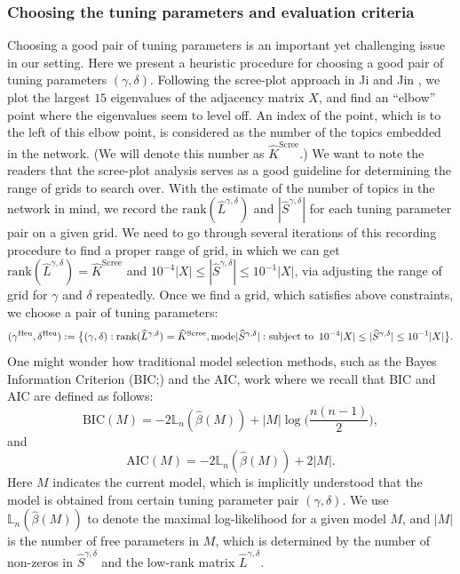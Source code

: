 \documentclass[AMS,STIX1COL]{WileyNJD-v2}
\newcommand{\Hquad}{\hspace{0.5em}}
\begin{document}
{\subsubsection{Choosing the tuning parameters and evaluation criteria} \label{sec:Eval-crit}
Choosing a good pair of tuning parameters is an important yet challenging issue in our setting.
Here we present a heuristic procedure for choosing a good pair of tuning parameters $(\gamma,\delta)$.
Following the scree-plot approach in Ji and Jin \cite{ji2016coauthorship}, we plot the largest $15$ eigenvalues of the adjacency matrix $X$, and find an ``elbow'' point where the eigenvalues seem to level off.
An index of the point, which is to the left of this elbow point, is considered as the number of the topics embedded in the network.
(We will denote this number as $\widehat{K}^{\text{Scree}}$.)
We want to note the readers that the scree-plot analysis serves as a good guideline for determining the range of grids to search over.
With the estimate of the number of topics in the network in mind, we record the $\text{rank}(\widehat{L}^{\gamma,\delta})$ and $|\widehat{S}^{\gamma,\delta}|$ for each tuning parameter pair on a given grid.
We need to go through several iterations of this recording procedure to find a proper range of grid, in which we can get $\text{rank}(\widehat{L}^{\gamma,\delta})=\widehat{K}^{\text{Scree}}$
and $10^{-4}|X| \leq |\widehat{S}^{\gamma,\delta}| \leq 10^{-1}|X|$, via adjusting the range of grid for $\gamma$ and $\delta$ repeatedly.
Once we find a grid, which satisfies above constraints, we choose a pair of tuning parameters: %
\[
    (\gamma^{\text{Heu}},\delta^{\text{Heu}}):=
    \big\{(\gamma,\delta): \text{rank}(\widehat{L}^{\gamma,\delta})=\widehat{K}^{\text{Scree}},
    \mbox{mode} |\widehat{S}^{\gamma,\delta}|: \mbox{subject to} \Hquad 10^{-4}|X| \leq |\widehat{S}^{\gamma,\delta}| \leq 10^{-1}|X| \big\}.
\]
One might wonder how traditional model selection methods, such as the Bayes Information Criterion (BIC;\cite{schwarz1978estimating}) and the AIC, work where we recall that BIC and AIC are defined as follows:
\[
\mbox{BIC}(M) = -2  \mathbb{L}_n( \hat{\beta}(M)) + |M| \log \bigg(\frac{n(n-1)}{2}\bigg),
\]
and
\[
\mbox{AIC}(M) = -2  \mathbb{L}_n( \hat{\beta}(M)) + 2|M|.
\]
Here $M$ indicates the current model, which is implicitly understood that the model is obtained from certain tuning parameter pair $(\gamma,\delta)$.
We use $\mathbb{L}_n( \hat{\beta}(M))$ to denote the maximal log-likelihood for a given model $M$,
and $|M|$ is the number of free parameters in $M$, which is determined by the number of non-zeros in $\widehat{S}^{\gamma,\delta}$ and the low-rank matrix $\widehat{L}^{\gamma,\delta}$.
}
\end{document}
